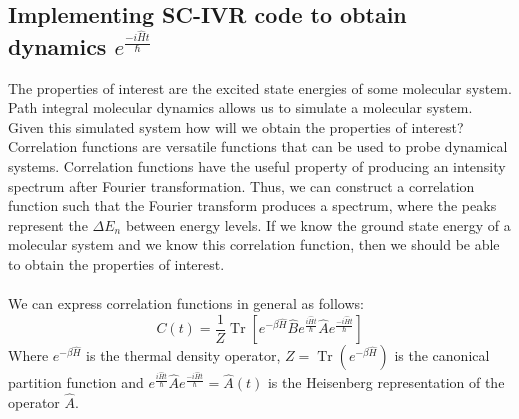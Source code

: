 \documentclass[12pt,letterpaper,oneside,final,titlepage]{article}               %
\numberwithin{equation}{section} %
\newcommand{\eBH}{e^{-\beta\hat{H}}}
\newcommand{\emiHt}{e^{\frac{-i\hat{H}t}{\hbar}}}
\newcommand{\eiHt}{e^{\frac{i\hat{H}t}{\hbar}}}
\DeclareMathOperator{\Tr}{Tr}
\begin{document}
\subsection{Implementing SC-IVR code to obtain dynamics $\emiHt$} 
The properties of interest are the excited state energies of some molecular system. 
Path integral molecular dynamics allows us to simulate a molecular system. 
Given this simulated system how will we obtain the properties of interest?
Correlation functions are versatile functions that can be used to probe dynamical systems.
Correlation functions have the useful property of producing an intensity spectrum after Fourier transformation.
Thus, we can construct a correlation function such that the Fourier transform produces a spectrum, where the peaks
represent the $\Delta E_{n}$ between energy levels.
If we know the ground state energy of a molecular system and we know this correlation function, then we should be able to obtain the properties of interest. \\ \\
We can express correlation functions in general as follows:
\begin{equation}
    C(t) = \frac{1}{Z}\Tr[\eBH\hat{B}\eiHt\hat{A}\emiHt]
\end{equation}
Where $\eBH$ is the thermal density operator, $Z = \Tr(\eBH)$ is the canonical partition function 
and $\eiHt\hat{A}\emiHt=\hat{A}(t)$ is the Heisenberg representation of the operator $\hat{A}$.
\end{document}
